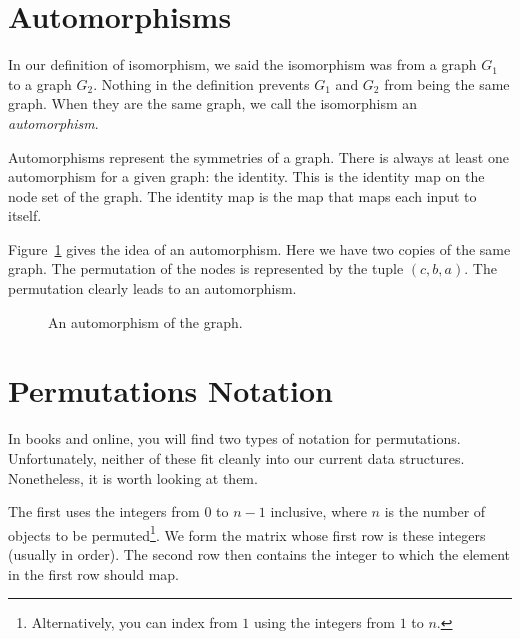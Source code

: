 \documentclass{iansnotes}
\begin{document}
\section{Automorphisms}
  In our definition of isomorphism, we said the isomorphism was from a graph $G_1$ to a graph $G_2$.
  Nothing in the definition prevents $G_1$ and $G_2$ from being the same graph.
  When they are the same graph, we call the isomorphism an \emph{automorphism}.

  Automorphisms represent the symmetries of a graph.
  There is always at least one automorphism for a given graph: the identity.
  This is the identity map on the node set of the graph.
  The identity map is the map that maps each input to itself.

  Figure~\ref{figure:autmorphism} gives the idea of an automorphism.
  Here we have two copies of the same graph.
  The permutation of the nodes is represented by the tuple $(c,b,a)$.
  The permutation clearly leads to an automorphism.

  \begin{figure}
    \centering
    \caption{An automorphism of the graph.}
    \label{figure:autmorphism}
  \end{figure}


\section{Permutations Notation}
  In books and online, you will find two types of notation for permutations.
  Unfortunately, neither of these fit cleanly into our current data structures.
  Nonetheless, it is worth looking at them.

  The first uses the integers from $0$ to $n-1$ inclusive, where $n$ is the number of objects to be permuted\footnote{Alternatively, you can index from $1$ using the integers from $1$ to $n$.}.
  We form the matrix whose first row is these integers (usually in order).
  The second row then contains the integer to which the element in the first row should map.
  
\end{document}
